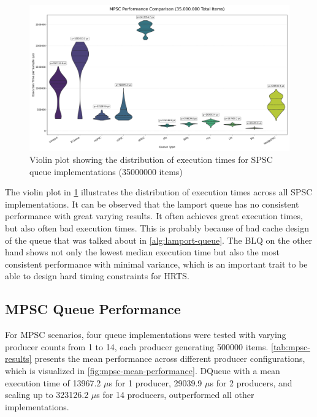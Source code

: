 \begin{figure}[htb]
\centering
\caption{Violin plot showing the distribution of execution times for SPSC queue implementations (35000000 items)}
\label{fig:spsc-violin}
\includegraphics[width=\textwidth]{images/results/spsc_queue_performance_violin_test.png}
\end{figure}

The violin plot in \cref{fig:spsc-violin} illustrates the distribution of execution times across all SPSC implementations. It can be observed that the lamport queue has no consistent performance with great varying results. It often achieves great execution times, but also often bad execution times. This is probably because of bad cache design of the queue that was talked about in \cref{alg:lamport-queue}. The \ac{BLQ} on the other hand shows not only the lowest median execution time but also the most consistent performance with minimal variance, which is an important trait to be able to design hard timing constraints for \ac{HRTS}. 

\subsection{\acf{MPSC} Queue Performance}
For \ac{MPSC} scenarios, four queue implementations were tested with varying producer counts from 1 to 14, each producer generating 500000 items. \cref{tab:mpsc-results} presents the mean performance across different producer configurations, which is visualized in \cref{fig:mpsc-mean-performance}. DQueue with a mean execution time of 13967.2 $\mu$s for 1 producer, 29039.9 $\mu$s for 2 producers, and scaling up to 323126.2 $\mu$s for 14 producers, outperformed all other implementations.

